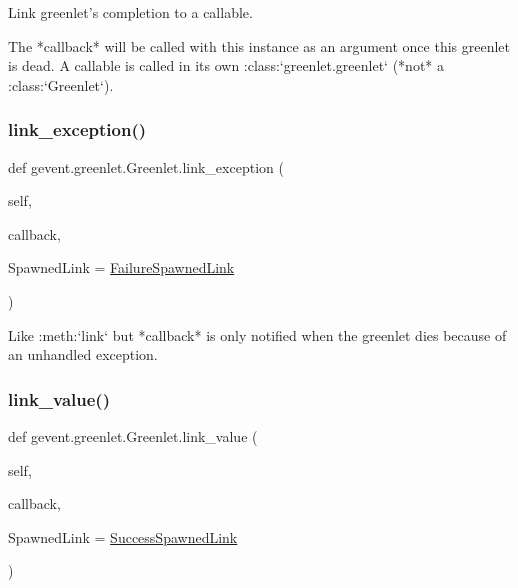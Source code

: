 \begin{DoxyVerb}Link greenlet's completion to a callable.

The *callback* will be called with this instance as an
argument once this greenlet is dead. A callable is called in
its own :class:`greenlet.greenlet` (*not* a
:class:`Greenlet`).
\end{DoxyVerb}
 \mbox{\label{classgevent_1_1greenlet_1_1_greenlet_abfa513d6025f881a04324fe92b6ceda0}} 
\subsubsection{\texorpdfstring{link\+\_\+exception()}{link\_exception()}}
{\footnotesize\ttfamily def gevent.\+greenlet.\+Greenlet.\+link\+\_\+exception (\begin{DoxyParamCaption}\item[{}]{self,  }\item[{}]{callback,  }\item[{}]{Spawned\+Link = {\ttfamily \hyperlink{classgevent_1_1greenlet_1_1_failure_spawned_link}{Failure\+Spawned\+Link}} }\end{DoxyParamCaption})}

\begin{DoxyVerb}Like :meth:`link` but *callback* is only notified when the
greenlet dies because of an unhandled exception.
\end{DoxyVerb}
 \mbox{\label{classgevent_1_1greenlet_1_1_greenlet_a9ab445117d755eaca856f963f38d352d}} 
\subsubsection{\texorpdfstring{link\+\_\+value()}{link\_value()}}
{\footnotesize\ttfamily def gevent.\+greenlet.\+Greenlet.\+link\+\_\+value (\begin{DoxyParamCaption}\item[{}]{self,  }\item[{}]{callback,  }\item[{}]{Spawned\+Link = {\ttfamily \hyperlink{classgevent_1_1greenlet_1_1_success_spawned_link}{Success\+Spawned\+Link}} }\end{DoxyParamCaption})}

